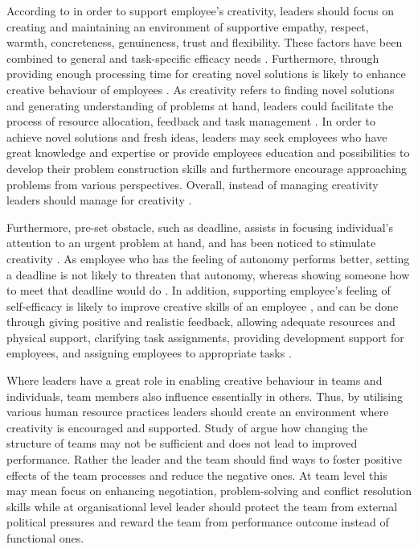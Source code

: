 According to \citet{isaksen1983toward} in order to support employee's creativity, leaders should focus on creating and maintaining an environment of supportive empathy, respect, warmth, concreteness, genuineness, trust and flexibility. These factors have been combined to general and task-specific efficacy needs \citep{mumford1988creativity}. Furthermore, through providing enough processing time for creating novel solutions is likely to enhance creative behaviour of employees \citep{isaksen1983toward}. As creativity refers to finding novel solutions and generating understanding of problems at hand, leaders could facilitate the process of resource allocation, feedback and task management \citep{mumford1988creativity}. In order to achieve novel solutions and fresh ideas, leaders may seek employees who have great knowledge and expertise or provide employees education and possibilities to develop their problem construction skills and furthermore encourage approaching problems from various perspectives. \citep{redmond1993putting} Overall, instead of managing creativity leaders should manage for creativity \citep{amabile2008creativity}.

Furthermore, pre-set obstacle, such as deadline, assists in focusing individual's attention to an urgent problem at hand, and has been noticed to stimulate creativity \citep{andriopoulos2000enhancing}. As employee who has the feeling of autonomy performs better, setting a deadline is not likely to threaten that autonomy, whereas showing someone how to meet that deadline would do \citep{mumford2002leading}. In addition, supporting employee's feeling of self-efficacy is likely to improve creative skills of an employee \citep{redmond1993putting}, and can be done through giving positive and realistic feedback, allowing adequate resources and physical support, clarifying task assignments, providing development support for employees, and assigning employees to appropriate tasks \citep{hennessey19881}.

Where leaders have a great role in enabling creative behaviour in teams and individuals, team members also influence essentially in others. Thus, by utilising various human resource practices leaders should create an environment where creativity is encouraged and supported. \citep{shalley2004leaders} Study of \citet{ancona1992demography} argue how changing the structure of teams may not be sufficient and does not lead to improved performance. Rather the leader and the team should find ways to foster positive effects of the team processes and reduce the negative ones. At team level this may mean focus on enhancing negotiation, problem-solving and conflict resolution skills while at organisational level leader should protect the team from external political pressures and reward the team from performance outcome instead of functional ones. \citep{ancona1992demography}

